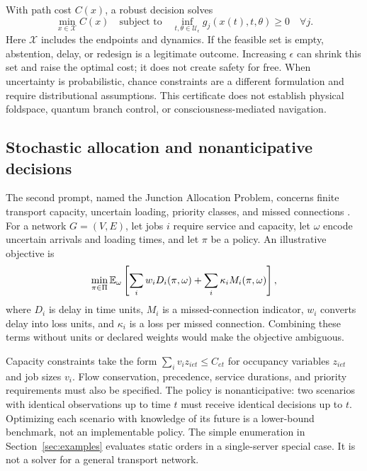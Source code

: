 With path cost $C(x)$, a robust decision solves
\begin{equation}
 \min_{x\in\mathcal X} C(x)
 \quad\text{subject to}\quad
 \inf_{t,\theta\in\mathcal U_\epsilon}g_j(x(t),t,\theta)\geq0\quad\forall j.
 \label{eq:robust}
\end{equation}
Here $\mathcal X$ includes the endpoints and dynamics. If the feasible set is empty, abstention, delay, or redesign is a legitimate outcome. Increasing $\epsilon$ can shrink this set and raise the optimal cost; it does not create safety for free. When uncertainty is probabilistic, chance constraints are a different formulation and require distributional assumptions. This certificate does not establish physical foldspace, quantum branch control, or consciousness-mediated navigation.

\subsection{Stochastic allocation and nonanticipative decisions}
The second prompt, named the Junction Allocation Problem, concerns finite transport capacity, uncertain loading, priority classes, and missed connections . For a network $G=(V,E)$, let jobs $i$ require service and capacity, let $\omega$ encode uncertain arrivals and loading times, and let $\pi$ be a policy. An illustrative objective is
\begin{equation}
 \min_{\pi\in\Pi}\mathbb{E}_\omega\left[
 \sum_i w_i D_i(\pi,\omega)+\sum_i\kappa_i M_i(\pi,\omega)
 \right],
 \label{eq:allocation}
\end{equation}
where $D_i$ is delay in time units, $M_i$ is a missed-connection indicator, $w_i$ converts delay into loss units, and $\kappa_i$ is a loss per missed connection. Combining these terms without units or declared weights would make the objective ambiguous.

Capacity constraints take the form $\sum_i v_i z_{iet}\leq C_{et}$ for occupancy variables $z_{iet}$ and job sizes $v_i$. Flow conservation, precedence, service durations, and priority requirements must also be specified. The policy is nonanticipative: two scenarios with identical observations up to time $t$ must receive identical decisions up to $t$. Optimizing each scenario with knowledge of its future is a lower-bound benchmark, not an implementable policy. The simple enumeration in Section~\ref{sec:examples} evaluates static orders in a single-server special case. It is not a solver for a general transport network.

